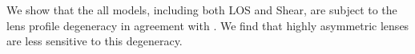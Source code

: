 We show that the all models, including both LOS and Shear, are subject to the lens profile degeneracy in agreement with \citet{Xu15,Schneider13}. We find that highly asymmetric lenses are less sensitive to this degeneracy.